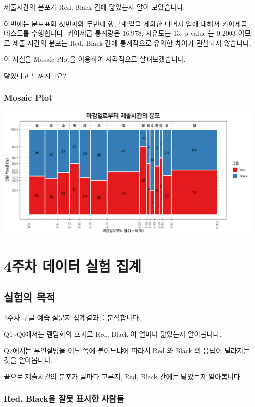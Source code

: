 \documentclass[
]{book}
\begin{document}
제출시간의 분포가 Red, Black 간에 닮았는지 알아 보았습니다.

이번에는 분포표의 첫번째와 두번째 행, '계'열을 제외한 나머지 열에 대해서 카이제곱테스트를 수행합니다.
카이제곱 통계량은 16.978, 자유도는 13, p-value 는 0.2003 이므로 제출 시간의 분포는 Red, Black 간에 통계적으로 유의한 차이가 관찰되지 않습니다.

이 사실을 Mosaic Plot을 이용하여 시각적으로 살펴보겠습니다.

닮았다고 느껴지나요?

\subsection{Mosaic Plot}\label{mosaic-plot-5}

\includegraphics{_main_files/figure-latex/unnamed-chunk-77-1.pdf}

\chapter{4주차 데이터 실험 집계}\label{uxc8fcuxcc28-uxb370uxc774uxd130-uxc2e4uxd5d8-uxc9d1uxacc4-3}

\section{실험의 목적}\label{uxc2e4uxd5d8uxc758-uxbaa9uxc801-3}

4주차 구글 예습 설문지 집계결과를 분석합니다.

Q1\textasciitilde Q6에서는 랜덤화의 효과로 Red, Black 이 얼마나 닮았는지 알아봅니다.

Q7에서는 부연설명을 어느 쪽에 붙이느냐에 따라서 Red 와 Black 의 응답이 달라지는 것을 알아봅니다.

끝으로 제출시간의 분포가 날마다 고른지, Red, Black 간에는 닮았는지 알아봅니다.

\subsection{Red, Black을 잘못 표시한 사람들}\label{red-blackuxc744-uxc798uxbabb-uxd45cuxc2dcuxd55c-uxc0acuxb78cuxb4e4-3}
\end{document}
